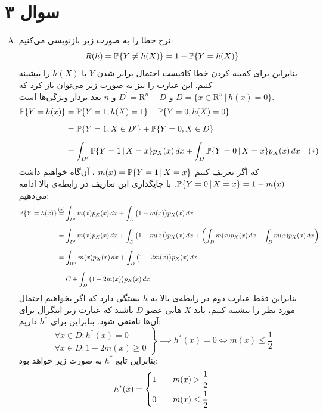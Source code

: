\documentclass[a4paper, 12pt]{article}
\newcommand{\myeq}[1]
{\stackrel{\mathclap{{\scriptsize \mbox{#1}}}}{=}}
\begin{document}
\section*{سوال ۳}
\begin{enumerate}[A)]
	\item
	نرخ خطا را به صورت زیر بازنویسی می‌کنیم:
	\[
	R(h) = {\mathbb P}\{Y \ne h(X)\} = 1 - {\mathbb P}\{Y = h(X)\}
	\]
	بنابراین برای کمینه کردن خطا کافیست احتمال برابر شدن $Y$ با $h(X)$ را بیشینه کنیم. این عبارت را نیز به صورت زیر می‌توان باز کرد که 
	$D = \{x\in \mathrm{R}^n \,|\, h(x) = 0\}$
	و
	$D^\prime = \mathrm{R}^n - D$
	و $n$ بعد بردار ویژگی‌ها است.
	\[
	\begin{aligned}
		{\mathbb P}\{Y=h(x)\} &= {\mathbb P}\{Y=1, h(X)=1\} + {\mathbb P}\{Y=0, h(X)=0\} \\[0.6em]
			&= {\mathbb P}\{Y=1, X\in D^\prime\} + {\mathbb P}\{Y=0, X\in D\} \\[0.6em]
			&= \int_{D^\prime} {\mathbb P}\{Y=1\,|\,X=x\}p_X(x)\,dx + \int_{D} {\mathbb P}\{Y=0\,|\,X=x\}p_X(x)\,dx \quad (\ast)
	\end{aligned}
	\]
	که اگر تعریف کنیم
	$m(x) = {\mathbb P}\{Y=1\,|\,X=x\}$
	، آن‌گاه خواهیم داشت
	${\mathbb P}\{Y=0\,|\,X=x\} = 1 - m(x)$.
	با جایگذاری این تعاریف در رابطه‌ی بالا ادامه می‌دهیم:
	\[
	\begin{aligned}
		\prob\{Y=h(x)\} &\myeq{$(\ast)$} \int_{D^\prime} m(x)p_X(x)\,dx + \int_{D} \big(1-m(x)\big)p_X(x)\,dx \\[0.6em]
		&= \int_{D^\prime} m(x)p_X(x)\,dx + \int_{D} \big(1-m(x)\big)p_X(x)\,dx + \left(\int_{D} m(x)p_X(x)\,dx -\int_{D} m(x)p_X(x)\,dx\right) \\[0.6em]
		&= \int_{\mathrm{R}^n} m(x)p_X(x)\,dx + \int_{D} \big(1 - 2m(x)\big)p_X(x)\,dx \\[0.6em]
		&= C + \int_{D} \big(1 - 2m(x)\big)p_X(x)\,dx
	\end{aligned}
	\]
	بنابراین فقط عبارت دوم در رابطه‌ی بالا به $h$ بستگی دارد که اگر بخواهیم احتمال مورد نظر را بیشینه کنیم، باید $X$ هایی عضو $D$ باشند که عبارت زیر انتگرال برای آن‌ها نامنفی شود. بنابراین برای $h^\ast$ داریم:
	\[
	\left.\begin{aligned}
		\forall x \in D: h^\ast(x) = 0 \\
		\forall x \in D: 1 - 2m(x) \ge 0
	\end{aligned}\right\} \implies h^\ast(x) = 0 \iff m(x) \le \frac{1}{2}
	\]
	بنابراین تابع $h^\ast$ به صورت زیر خواهد بود:
	\[
	h^\ast(x) = \begin{dcases}
		1 &\quad m(x) > \frac{1}{2} \\
		0 &\quad m(x) \le \frac{1}{2} 

\end{dcases}\]
\end{enumerate}
\end{document}
